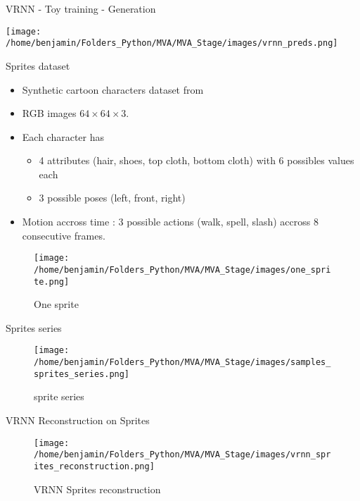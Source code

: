 \begin{frame}{VRNN - Toy training - Generation}
    \begin{center}
    \texttt{[image: /home/benjamin/Folders\_Python/MVA/MVA\_Stage/images/vrnn\_preds.png]}
    \end{center}
\end{frame}


\begin{frame}{Sprites dataset}
    \begin{itemize}
        \item Synthetic cartoon characters dataset from \cite{li_disentangled_2018}
        \item RGB images $64 \times 64 \times 3$. 
        \item Each character has 
        \begin{itemize}
            \item 4 attributes (hair, shoes, top cloth, bottom cloth) with 6 possibles values each
            \item 3 possible poses (left, front, right) 
        \end{itemize}
        \item Motion accross time : 3 possible actions (walk, spell, slash) accross 8 consecutive frames.
    \end{itemize}
    \begin{figure}[H]
        \centering
        \texttt{[image: /home/benjamin/Folders\_Python/MVA/MVA\_Stage/images/one\_sprite.png]}
        \caption{One sprite}
        \label{fig:One sprite}
    \end{figure}
\end{frame}
\begin{frame}{Sprites series}
    \begin{figure}[H]
        \centering
        \texttt{[image: /home/benjamin/Folders\_Python/MVA/MVA\_Stage/images/samples\_sprites\_series.png]}
        \caption{sprite series}
        \label{fig:sprite series}
    \end{figure}
\end{frame}

\begin{frame}{VRNN Reconstruction on Sprites}
    \begin{figure}[H]
    \centering
    \texttt{[image: /home/benjamin/Folders\_Python/MVA/MVA\_Stage/images/vrnn\_sprites\_reconstruction.png]}
    \caption{VRNN Sprites reconstruction}
    \label{fig:VRNN Sprites reconstruction}
\end{figure}
\end{frame}

